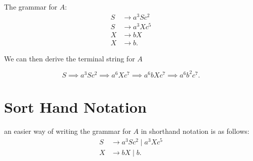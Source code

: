 \documentclass[12pt]{book}
\begin{document}
The grammar for $A$:
 \begin{align*}
         S&\to a^3Sc^2\\
         S&\to a^3Xc^5\\
         X&\to bX\\
         X&\to b
.\end{align*}

We can then derive the terminal string for $A$

 \[
S\implies a^3Sc^2 \implies  a^6Xc^7 \implies a^6bXc^7\implies a^6b^2c^7
.\] 

\section*{Sort Hand Notation}
an easier way of writing the grammar for $A$ in shorthand notation is as follows:
\begin{align*}
        S&\to a^3Sc^2 \mid a^3Xc^5 \\
        X&\to bX  \mid b
.\end{align*}
\end{document}
